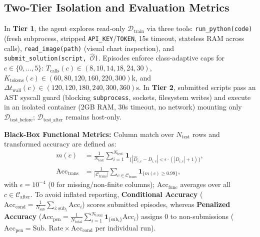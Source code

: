 \documentclass[sigconf]{acmart}
\begin{document}
\subsection{Two-Tier Isolation and Evaluation Metrics}
\label{sec:metrics}
In \textbf{Tier 1}, the agent explores read-only $\mathcal{D}_{\text{train}}$ via three tools: \texttt{run\_python(code)} (fresh subprocess, stripped \texttt{API\_KEY}/\texttt{TOKEN}, 15s timeout, stateless RAM across calls), \texttt{read\_image(path)} (visual chart inspection), and \texttt{submit\_solution(script, $\widehat{\mathcal{O}}$)}. Episodes enforce class-adaptive caps for $c \in \{0,\dots,5\}$: $T_{\text{calls}}(c) \in (8,10,14,18,24,30)$, $K_{\text{tokens}}(c) \in (60,80,120,160,220,300)\text{k}$, and $\Delta t_{\text{wall}}(c) \in (120,120,180,240,300,360)\text{s}$. In \textbf{Tier 2}, submitted scripts pass an AST syscall guard (blocking \texttt{subprocess}, sockets, filesystem writes) and execute in an isolated container (2GB RAM, 30s timeout, no network) mounting only $\mathcal{D}_{\text{test\_before}}$; $\mathcal{D}_{\text{test\_after}}$ remains host-only.

\noindent\textbf{Black-Box Functional Metrics:} Column match over $N_{\text{test}}$ rows and transformed accuracy are defined as:
\begin{align}
m(c) &= \frac{1}{N_{\text{test}}}\sum_{i=1}^{N_{\text{test}}} \mathbf{1}_{\{|\widehat{D}_{i,c}-D_{i,c}| < \epsilon\cdot(|D_{i,c}|+1)\}}, \label{eq:col_match}\\
\text{Acc}_{\text{trans}} &= \frac{1}{|\mathcal{C}_{\text{trans}}|} \sum_{c\in\mathcal{C}_{\text{trans}}} \mathbf{1}_{\{m(c)\ge 0.99\}}, \label{eq:acc_trans}
\end{align}
with $\epsilon=10^{-4}$ (0 for missing/non-finite columns); $\text{Acc}_{\text{func}}$ averages over all $c \in \mathcal{C}_{\text{after}}$. To avoid inflated reporting, \textbf{Conditional Accuracy} ($\text{Acc}_{\text{cond}} = \frac{1}{N_{\text{sub}}}\sum_{i:\text{sub}_i}\text{Acc}_i$) scores submitted episodes, whereas \textbf{Penalized Accuracy} ($\text{Acc}_{\text{pen}} = \frac{1}{N_{\text{total}}}\sum_{i=1}^{N_{\text{total}}}\mathbf{1}_{\{\text{sub}_i\}}\text{Acc}_i$) assigns 0 to non-submissions ($\text{Acc}_{\text{pen}} = \text{Sub.\ Rate} \times \text{Acc}_{\text{cond}}$ per individual run).
\end{document}
